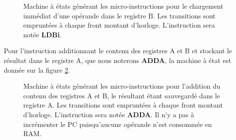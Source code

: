 \begin{figure}[htbp]
  \centering{}
  \caption{\label{fig:transducteur_ldbi} Machine à états générant les micro-instructions pour le chargement immédiat d'une opérande dans le registre B. Les transitions sont empruntées à chaque front montant d'horloge. L'instruction sera notée \textbf{LDBi}.}
\end{figure}

Pour l'instruction additionnant le contenu des registres A et B et stockant le résultat dans le registre A, que nous noterons \textbf{ADDA}, la machine à état est donnée sur la figure \ref{fig:transducteur_adda}.

\begin{figure}[htbp]
  \centering{}
  \caption{\label{fig:transducteur_adda} Machine à états générant les micro-instructions pour l'addition du contenu des registres A et B, le résultant étant sauvegardé dans le registre A. Les transitions sont empruntées à chaque front montant d'horloge. L'instruction sera notée \textbf{ADDA}. Il n'y a pas à incrémenter le PC puisqu'aucune opérande n'est consommée en RAM.}
\end{figure}

